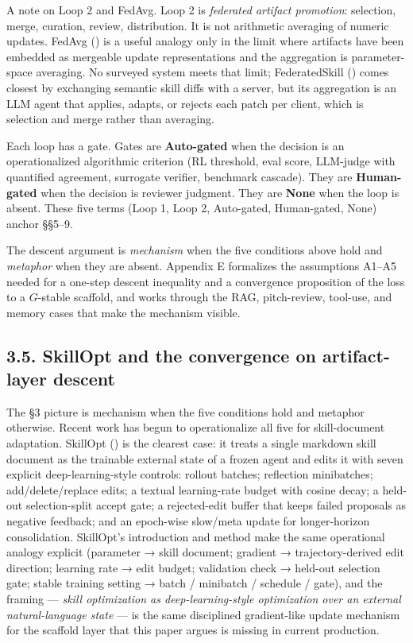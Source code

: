 \documentclass[
]{article}
\begin{document}
A note on Loop 2 and FedAvg. Loop 2 is \emph{federated artifact
promotion}: selection, merge, curation, review, distribution. It is not
arithmetic averaging of numeric updates. FedAvg
() is a useful
analogy only in the limit where artifacts have been embedded as
mergeable update representations and the aggregation is parameter-space
averaging. No surveyed system meets that limit; FederatedSkill
() comes
closest by exchanging semantic skill diffs with a server, but its
aggregation is an LLM agent that applies, adapts, or rejects each patch
per client, which is selection and merge rather than averaging.

Each loop has a gate. Gates are \textbf{Auto-gated} when the decision is
an operationalized algorithmic criterion (RL threshold, eval score,
LLM-judge with quantified agreement, surrogate verifier, benchmark
cascade). They are \textbf{Human-gated} when the decision is reviewer
judgment. They are \textbf{None} when the loop is absent. These five
terms (Loop 1, Loop 2, Auto-gated, Human-gated, None) anchor §§5--9.

The descent argument is \emph{mechanism} when the five conditions above
hold and \emph{metaphor} when they are absent. Appendix E formalizes the
assumptions A1--A5 needed for a one-step descent inequality and a
convergence proposition of the loss to a \(G\)-stable scaffold, and
works through the RAG, pitch-review, tool-use, and memory cases that
make the mechanism visible.

\subsection{3.5. SkillOpt and the convergence on artifact-layer
descent}\label{skillopt-and-the-convergence-on-artifact-layer-descent}

The §3 picture is mechanism when the five conditions hold and metaphor
otherwise. Recent work has begun to operationalize all five for
skill-document adaptation. SkillOpt () is the clearest case: it treats a single markdown
skill document as the trainable external state of a frozen agent and
edits it with seven explicit deep-learning-style controls: rollout
batches; reflection minibatches; add/delete/replace edits; a textual
learning-rate budget with cosine decay; a held-out selection-split
accept gate; a rejected-edit buffer that keeps failed proposals as
negative feedback; and an epoch-wise slow/meta update for longer-horizon
consolidation. SkillOpt's introduction and method make the same
operational analogy explicit (parameter → skill document; gradient →
trajectory-derived edit direction; learning rate → edit budget;
validation check → held-out selection gate; stable training setting →
batch / minibatch / schedule / gate), and the framing --- \emph{skill
optimization as deep-learning-style optimization over an external
natural-language state} --- is the same disciplined gradient-like update
mechanism for the scaffold layer that this paper argues is missing in
current production.
\end{document}
